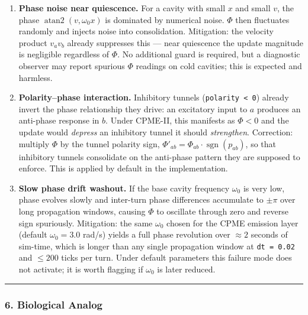 \documentclass[
  11pt,
  a4paper,
]{article}
\begin{document}
\begin{enumerate}
\def\labelenumi{\arabic{enumi}.}
\item
  \textbf{Phase noise near quiescence.} For a cavity with small \(x\)
  and small \(v\), the phase \(\operatorname{atan2}(v, \omega_0 x)\) is
  dominated by numerical noise. \(\Phi\) then fluctuates randomly and
  injects noise into consolidation. Mitigation: the velocity product
  \(v_a v_b\) already suppresses this --- near quiescence the update
  magnitude is negligible regardless of \(\Phi\). No additional guard is
  required, but a diagnostic observer may report spurious \(\Phi\)
  readings on cold cavities; this is expected and harmless.
\item
  \textbf{Polarity--phase interaction.} Inhibitory tunnels
  (\texttt{polarity\ \textless{}\ 0}) already invert the phase
  relationship they drive: an excitatory input to \(a\) produces an
  anti-phase response in \(b\). Under CPME-II, this manifests as
  \(\Phi < 0\) and the update would \emph{depress} an inhibitory tunnel
  it should \emph{strengthen}. Correction: multiply \(\Phi\) by the
  tunnel polarity sign,
  \(\Phi'_{ab} = \Phi_{ab} \cdot \operatorname{sgn}(p_{ab})\), so that
  inhibitory tunnels consolidate on the anti-phase pattern they are
  supposed to enforce. This is applied by default in the implementation.
\item
  \textbf{Slow phase drift washout.} If the base cavity frequency
  \(\omega_0\) is very low, phase evolves slowly and inter-turn phase
  differences accumulate to \(\pm \pi\) over long propagation windows,
  causing \(\Phi\) to oscillate through zero and reverse sign
  spuriously. Mitigation: the same \(\omega_0\) chosen for the CPME
  emission layer (default \(\omega_0 = 3.0\) rad/s) yields a full phase
  revolution over \(\approx 2\) seconds of sim-time, which is longer
  than any single propagation window at \texttt{dt\ =\ 0.02} and
  \(\leq 200\) ticks per turn. Under default parameters this failure
  mode does not activate; it is worth flagging if \(\omega_0\) is later
  reduced.
\end{enumerate}

\begin{center}\rule{0.5\linewidth}{0.5pt}\end{center}

\subsubsection{6. Biological Analog}\label{biological-analog-1}
\end{document}
